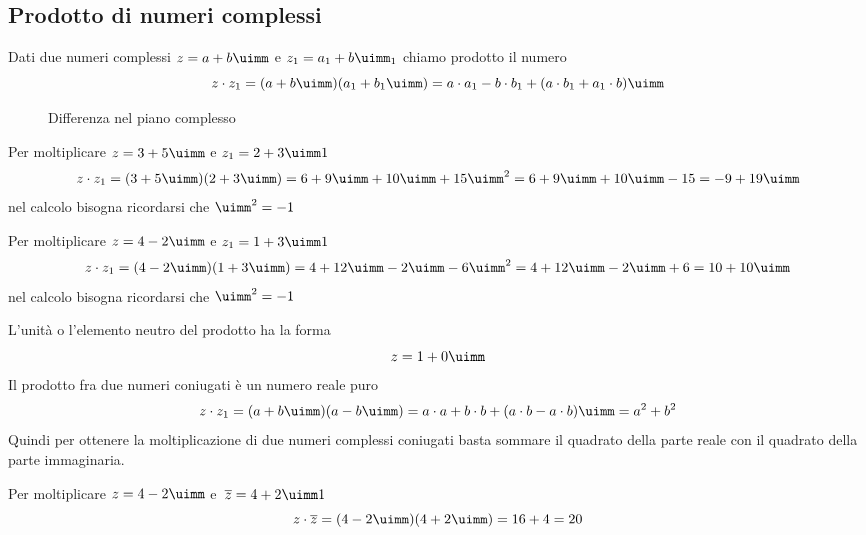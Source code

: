 \subsection{Prodotto di numeri complessi}
\begin{definizione}
	Dati due numeri complessi  $z=a+b\uimm $ e  $z_1=a_1+b\uimm _1$ chiamo prodotto il numero \[z\cdot z_1=(a+b\uimm)(a_1+b_1\uimm)=a\cdot a_1-b\cdot b_1+(a\cdot b_1+a_1\cdot b)\uimm\]
\end{definizione}
\begin{figure}
	\centering
	
	\caption{Differenza nel piano complesso}
	\label{fig:DifferenzaPianoComplesso}
\end{figure}
\begin{esempio}
	Per moltiplicare $z=3+5\uimm $ e  $z_1=2+3\uimm1$  \[z\cdot z_1=(3+5\uimm)(2+3\uimm)= 6+9\uimm +10\uimm +15\uimm^2=6+9\uimm +10\uimm -15 =-9+19\uimm \]
	nel calcolo bisogna ricordarsi che $\uimm^2=-1$
\end{esempio}
\begin{esempio}
	Per moltiplicare $z=4-2\uimm $ e  $z_1=1+3\uimm1$  \[z\cdot z_1=(4-2\uimm)(1+3\uimm)= 4+12\uimm -2\uimm -6\uimm^2= 4+12\uimm -2\uimm +6=10+10\uimm \]
	nel calcolo bisogna ricordarsi che $\uimm^2=-1$
\end{esempio}

L'unità o l'elemento neutro del prodotto ha la forma\[z=1+0\uimm\] 
Il prodotto fra due numeri coniugati  è un numero reale puro
\[z\cdot z_1=(a+b\uimm)(a-b\uimm)=a\cdot a+b\cdot b+(a\cdot b-a\cdot b)\uimm=a^2+b^2\]
Quindi per ottenere la moltiplicazione di due numeri complessi coniugati basta sommare il quadrato della parte reale con il quadrato della parte immaginaria.
\begin{esempio}
	Per moltiplicare $z=4-2\uimm $ e\  $\overline{z}=4+2\uimm1$  \[z\cdot \overline{z}=(4-2\uimm)(4+2\uimm)= 16+4=20\]
\end{esempio}
